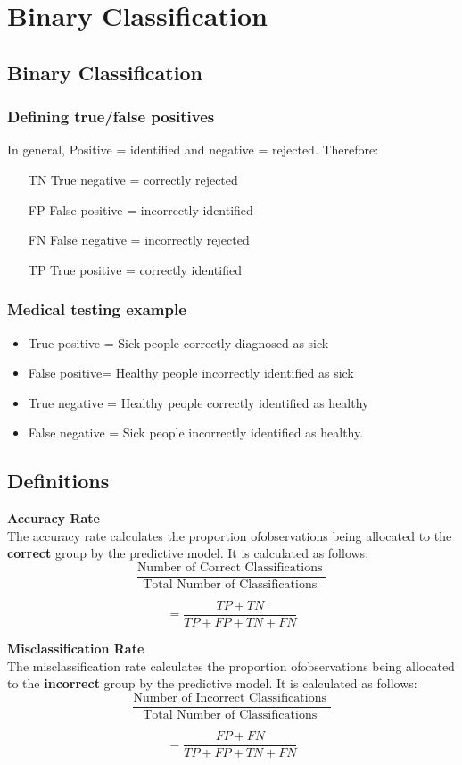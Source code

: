 \documentclass[12pt]{article}
\begin{document}
\section*{Binary Classification}

\subsection*{Binary Classification}
\subsubsection*{Defining true/false positives}
In general, Positive = identified and negative = rejected. Therefore:

\begin{itemize}
\item[TN] True negative = correctly rejected
\item[FP] False positive = incorrectly identified
\item[FN] False negative = incorrectly rejected
\item[TP] True positive = correctly identified
\end{itemize}
\subsubsection*{Medical testing example}
\begin{itemize}
\item True positive = Sick people correctly diagnosed as sick

\item False positive= Healthy people incorrectly identified as sick

\item True negative = Healthy people correctly identified as healthy

\item False negative = Sick people incorrectly identified as healthy.
\end{itemize}
\newpage
\subsection*{Definitions}
\textbf{Accuracy Rate}\\
The accuracy rate calculates the proportion ofobservations being allocated to the \textbf{correct} group by the predictive model. It is calculated as follows:
\[ \frac{
\mbox{Number of Correct Classifications }}{\mbox{Total Number of Classifications }} \]

\[ = \frac{TP + TN}{TP+FP+TN+FN}\]


\noindent \textbf{Misclassification Rate}\\
The misclassification rate calculates the proportion ofobservations being allocated to the \textbf{incorrect} group by the predictive model. It is calculated as follows:
\[ \frac{
\mbox{Number of Incorrect Classifications }}{\mbox{Total Number of Classifications }} \]

\[ = \frac{FP + FN}{TP+FP+TN+FN}\]
\end{document}
